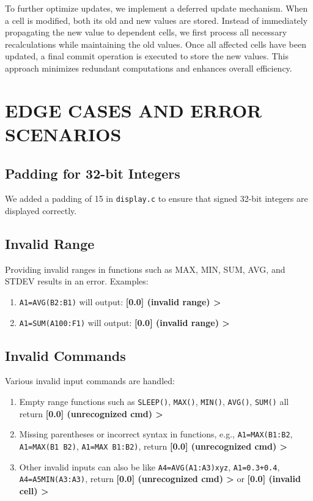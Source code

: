 \documentclass[a4paper]{article}
\begin{document}
To further optimize updates, we implement a deferred update mechanism. When a cell is modified, both its old and new values are stored. Instead of immediately propagating the new value to dependent cells, we first process all necessary recalculations while maintaining the old values. Once all affected cells have been updated, a final commit operation is executed to store the new values. This approach minimizes redundant computations and enhances overall efficiency.


\section{EDGE CASES AND ERROR SCENARIOS}

\subsection{Padding for 32-bit Integers}
We added a padding of 15 in \texttt{display.c} to ensure that signed 32-bit integers are displayed correctly.

\subsection{Invalid Range}
Providing invalid ranges in functions such as MAX, MIN, SUM, AVG, and STDEV results in an error. Examples:
\begin{enumerate}
    \item \texttt{A1=AVG(B2:B1)} will output: \textbf{[0.0] (invalid range) >}
    \item \texttt{A1=SUM(A100:F1)} will output: \textbf{[0.0] (invalid range) >}
\end{enumerate}

\subsection{Invalid Commands}
Various invalid input commands are handled:
\begin{enumerate}
    \item Empty range functions such as \texttt{SLEEP()}, \texttt{MAX()}, \texttt{MIN()}, \texttt{AVG()}, \texttt{SUM()} all return \textbf{[0.0] (unrecognized cmd) >}
    \item Missing parentheses or incorrect syntax in functions, e.g., \texttt{A1=MAX(B1:B2}, \texttt{A1=MAX(B1 B2)}, \texttt{A1=MAX B1:B2)}, return \textbf{[0.0] (unrecognized cmd) >}
    \item Other invalid inputs can also be like
    \texttt{A4=AVG(A1:A3)xyz}, \texttt{A1=0.3+0.4}, \texttt{A4=A5MIN(A3:A3)}, return \textbf{[0.0] (unrecognized cmd) >} or \textbf{ [0.0] (invalid cell) >}
\end{enumerate}
\end{document}

